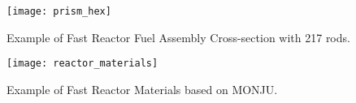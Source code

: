 \begin{frame}
  \begin{figure}
    \centering
    \texttt{[image: prism\_hex]}
    \caption{Example of Fast Reactor Fuel Assembly Cross-section with 217 rods.}
    \label{fig:prism_hex}
  \end{figure}
\end{frame}

\begin{frame}
  \begin{figure}
    \centering
    \texttt{[image: reactor\_materials]}
    \caption{Example of Fast Reactor Materials based on MONJU.}
    \label{fig:reactor_materials}
  \end{figure}
\end{frame}
